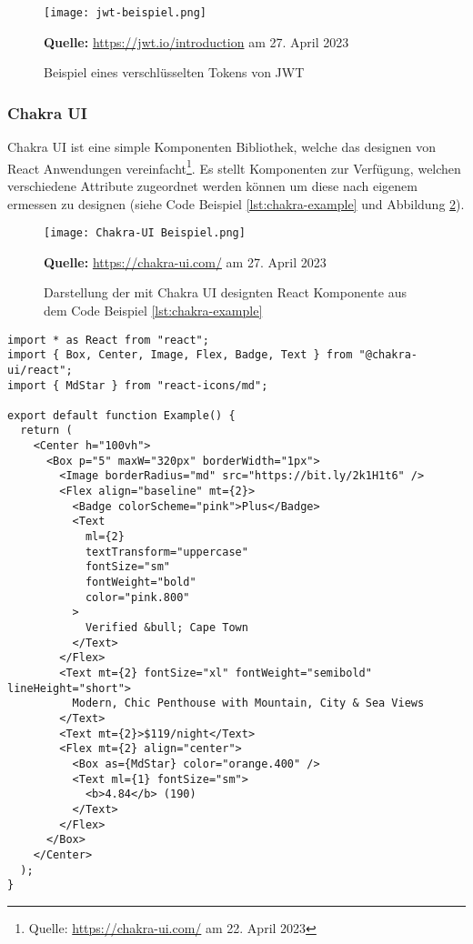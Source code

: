   \begin{figure}[hb]
  \centering
  \texttt{[image: jwt-beispiel.png]}
  
  
\raggedleft
    \footnotesize\sffamily\textbf{Quelle:} \url{https://jwt.io/introduction} am 27. April 2023
  \caption{Beispiel eines verschlüsselten Tokens von JWT}
  \label{fig:jwt-example}
\end{figure}
        \subsubsection{Chakra UI}
        \label{sec:chakraUI}
Chakra UI ist eine simple Komponenten Bibliothek, welche das designen von React Anwendungen vereinfacht\footnote{Quelle: \url{https://chakra-ui.com/} am 22. April 2023}. Es stellt Komponenten zur Verfügung, welchen verschiedene Attribute zugeordnet werden können um diese nach eigenem ermessen zu designen (siehe Code Beispiel \ref{lst:chakra-example} und Abbildung \ref{fig:chakra-example}).


  \begin{figure}[h]
  \centering
  \texttt{[image: Chakra-UI Beispiel.png]}
  
\raggedleft
    \footnotesize\sffamily\textbf{Quelle:} \url{https://chakra-ui.com/} am 27. April 2023
  \caption{Darstellung der mit Chakra UI designten React Komponente aus dem Code Beispiel \ref{lst:chakra-example}}
  \label{fig:chakra-example}
\end{figure}
  

\begin{lstlisting}[style=codeStyle, caption={Beispiel mit Chakra UI designten React Komponente (siehe Abbildung  \textbf{Quelle:} \url{https://chakra-ui.com/} am 27. April 2023}, label={lst:chakra-example}]
import * as React from "react";
import { Box, Center, Image, Flex, Badge, Text } from "@chakra-ui/react";
import { MdStar } from "react-icons/md";

export default function Example() {
  return (
    <Center h="100vh">
      <Box p="5" maxW="320px" borderWidth="1px">
        <Image borderRadius="md" src="https://bit.ly/2k1H1t6" />
        <Flex align="baseline" mt={2}>
          <Badge colorScheme="pink">Plus</Badge>
          <Text
            ml={2}
            textTransform="uppercase"
            fontSize="sm"
            fontWeight="bold"
            color="pink.800"
          >
            Verified &bull; Cape Town
          </Text>
        </Flex>
        <Text mt={2} fontSize="xl" fontWeight="semibold" lineHeight="short">
          Modern, Chic Penthouse with Mountain, City & Sea Views
        </Text>
        <Text mt={2}>$119/night</Text>
        <Flex mt={2} align="center">
          <Box as={MdStar} color="orange.400" />
          <Text ml={1} fontSize="sm">
            <b>4.84</b> (190)
          </Text>
        </Flex>
      </Box>
    </Center>
  );
}
\end{lstlisting}
